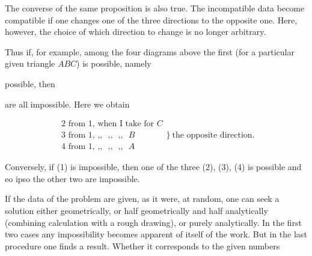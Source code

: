 The converse of the same proposition is also true. The incompatible data become compatible if one changes one of the three directions to the opposite one. Here, however, the choice of which direction to change is no longer arbitrary.

Thus if, for example, among the four diagrams above the first (for a particular given triangle $ABC$) is possible, namely

\begin{center}\end{center}

possible, then

\begin{center}\quad \quad \end{center}

are all impossible. Here we obtain

\[
\begin{array}{l}
\text{2 from 1, when I take for } C\\
\text{3 from 1, } \text{,,} \text{ } \text{,,} \text{ } \text{,,} \text{ } B\\
\text{4 from 1, } \text{,,} \text{ } \text{,,} \text{ } \text{,,} \text{ } A
\end{array}
\Big\}\ \text{the opposite direction.}
\]

Conversely, if (1) is impossible, then one of the three (2), (3), (4) is possible and eo ipso the other two are impossible.

If the data of the problem are given, as it were, at random, one can seek a solution either geometrically, or half geometrically and half analytically (combining calculation with a rough drawing), or purely analytically. In the first two cases any impossibility becomes apparent of itself  of the work. But in the last procedure one  finds a result. Whether it corresponds to the given numbers\space%
